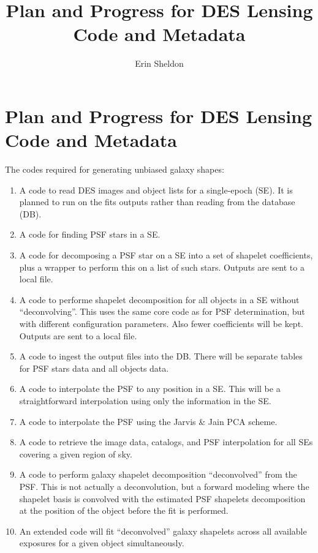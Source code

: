 \documentclass[12pt]{article}
\title{Plan and Progress for DES Lensing Code and Metadata}
\author{Erin Sheldon}
\begin{document}
\section*{Plan and Progress for DES Lensing Code and Metadata} 

The codes required for generating unbiased galaxy shapes:

\begin{enumerate}
    \item A code to read DES images and object lists for a single-epoch (SE).
        It is planned to run on the fits outputs rather than reading from the
        database (DB).
    \item A code for finding PSF stars in a SE.
    \item A code for decomposing a PSF star on a SE into a set of shapelet 
        coefficients, plus a wrapper to perform this on a list of such stars.
        Outputs are sent to a local file.
    \item A code to performe shapelet decomposition for all objects in a SE 
        without ``deconvolving''.  This uses the same core code as for PSF
        determination, but with different configuration parameters.  Also
        fewer coefficients will be kept.  Outputs are sent to a local file.
    \item A code to ingest the output files into the DB.  There will be
        separate tables for PSF stars data and all objects data.
    \item A code to interpolate the PSF to any position in a SE.  This will be
        a straightforward interpolation using only the information in the SE.
    \item A code to interpolate the PSF using the Jarvis \& Jain PCA scheme.
    \item A code to retrieve the image data, catalogs, and PSF interpolation
        for all SEs covering a given region of sky.
    \item A code to perform galaxy shapelet decomposition ``deconvolved'' from
        the PSF.  This is not actually a deconvolution, but a forward modeling
        where the shapelet basis is convolved with the estimated PSF shapelets
        decomposition at the position of the object before the fit is 
        performed.  
    \item An extended code will fit ``deconvolved'' galaxy shapelets across 
        all available exposures for a given object simultaneously.
\end{enumerate}
\end{document}
